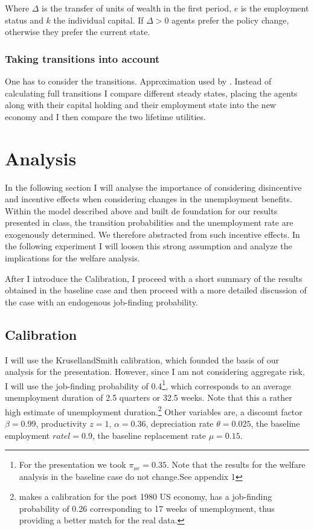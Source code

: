 \documentclass[a4paper,12pt]{article}
\begin{document}
Where $\Delta$ is the transfer of units of wealth in the first period, $e$ is the employment status and $k$ the individual capital. If $ \Delta>0 $ agents prefer the policy change, otherwise they prefer the current state. 

\subsubsection*{Taking transitions into account}

One has to consider the transitions. Approximation used by \cite{KrusellMukoyamaSahin}. Instead of calculating full transitions I compare different steady states, placing the agents along with their capital holding and their employment state into the new economy and I then compare the two lifetime utilities. 




\section{Analysis}

In the following section I will analyse the importance of considering disincentive and incentive effects when considering changes in the unemployment benefits. Within the model described above and built de foundation for our results presented in class, the transition probabilities and the unemployment rate are exogenously determined. We therefore abstracted from such incentive effects. In the following experiment I will loosen this strong assumption and analyze the implications for the welfare analysis. 

After I introduce the Calibration, I proceed with a short summary of the results obtained in the baseline case and then proceed with a more detailed discussion of the case with an endogenous job-finding probability. 


\subsection{Calibration}

I will use the KrusellandSmith calibration, which founded the basis of our analysis for the presentation. However, since I am not considering aggregate risk, I will use the job-finding probability of 0.4\footnote{For the presentation we took $\pi_{ue}=0.35$. Note that the results for the welfare analysis in the baseline case do not change.See appendix 1}, which corresponds to an average unemployment duration of 2.5 quarters or 32.5 weeks. Note that this a rather high estimate of unemployment duration.\footnote{\cite{mukoyama} makes a calibration for the post 1980 US economy, has a job-finding probability of 0.26 corresponding to 17 weeks of unemployment, thus providing a better match for the real data.}
Other variables are, a discount factor $\beta = 0.99$, productivity $z = 1$, $\alpha = 0.36$, depreciation rate $\theta = 0.025$, the baseline employment $rate l=0.9$, the baseline replacement rate $\mu = 0.15$.
\end{document}
